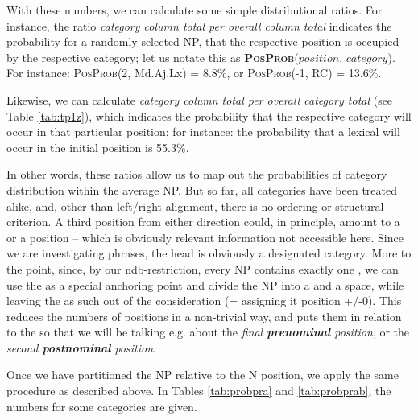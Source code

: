 \documentclass[output=paper,colorlinks,citecolor=brown,draft]{langscibook}
\begin{document}
With these numbers, we can calculate some simple distributional ratios. For instance, the ratio \textit{category column total per overall column total} indicates the probability for a randomly selected NP, that the respective position is occupied by the respective category; let us notate this as \textbf{\textsc{PosProb}}($position$, $category$). For instance: \textsc{PosProb}(2, Md.Aj.Lx) =  %
8.8\%, or \textsc{PosProb}(-1, RC) =  %
13.6\%.  



Likewise, we can calculate \textit{category column total per overall category total} (see Table \ref{tab:tp1z}), which  indicates the probability that the respective category will occur in that particular position; for instance: the probability that a lexical  will occur in the initial position  is %
55.3\%. 


In other words, these ratios allow us to map out the probabilities of category distribution within the average NP.   
But so far, all categories have been treated alike, and, other than left/right alignment, there is no ordering or structural criterion. A third position from either direction could, in principle, amount to a  or a  position -- which is obviously relevant information not accessible here.  
Since we are investigating  phrases, the head  is obviously a designated category. More to the point, since, by our ndb-restriction, every NP contains exactly one , we can use the  as a special anchoring point and divide the NP into a  and a  space, while leaving the  as such out of the consideration (= assigning it position +/-0).  This reduces the numbers of positions in a non-trivial way, and puts them in relation to the  so that we will be talking e.g. about the \textit{final \textbf{prenominal} position}, or the \textit{second \textbf{postnominal} position}.  

Once we have partitioned the NP relative to the N position, we apply the same procedure as described above. In Tables \ref{tab:probpra} and \ref{tab:probprab}, the numbers for some categories are given.  
\end{document}
